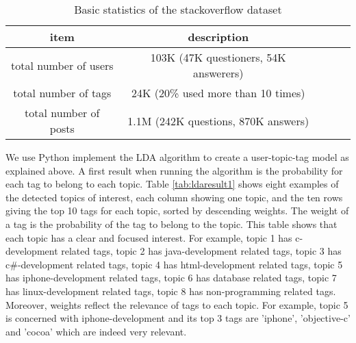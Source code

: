 \begin{table}[htp]
\caption{Basic statistics of the stackoverflow dataset}
\label{tab:stackoverflowdata}
\centering
\begin{tabular}{|c|c|c|c|c|}
\hline
\textbf{item} & \textbf{description} \\
\hline
total number of users & 103K (47K questioners, 54K answerers)\\
\hline
total number of tags & 24K (20\% used more than 10 times)\\
\hline
total number of posts & 1.1M (242K questions, 870K answers) \\
\hline
\end{tabular}
\end{table}



We use Python implement the LDA algorithm to create a user-topic-tag model as explained above.
A first result when running the algorithm is the probability for each tag to belong to each topic. 
Table \ref{tab:ldaresult1} shows eight examples of the detected topics of interest, each column showing one topic, and the ten rows giving the top 10 tags for each topic, sorted by descending weights. The weight of a tag is the probability of the tag to belong to the topic.  
This table shows that each topic has a clear and focused interest. For example, topic 1 has c-development related tags, topic 2 has java-development related tags, topic 3 has c\#-development related tags, topic 4 has html-development related tags, topic 5 has iphone-development related tags, topic 6 has database related tags, topic 7 has linux-development related tags, topic 8 has non-programming related tags. 
Moreover, weights reflect the relevance of tags to each topic. For example, topic 5 is concerned with iphone-development and its top 3 tags are 'iphone', 'objective-c' and 'cocoa' which are indeed very relevant.
